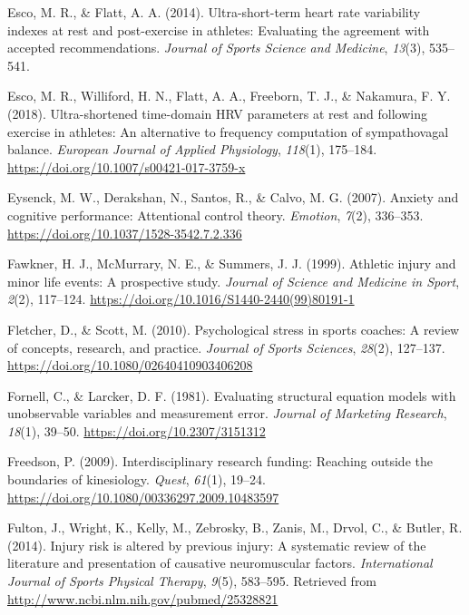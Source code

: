 \documentclass[man,floatsintext]{apa6}
\begin{document}
\leavevmode\hypertarget{ref-Esco2014}{}%
Esco, M. R., \& Flatt, A. A. (2014). Ultra-short-term heart rate variability indexes at rest and post-exercise in athletes: Evaluating the agreement with accepted recommendations. \emph{Journal of Sports Science and Medicine}, \emph{13}(3), 535--541.

\leavevmode\hypertarget{ref-Esco2018}{}%
Esco, M. R., Williford, H. N., Flatt, A. A., Freeborn, T. J., \& Nakamura, F. Y. (2018). Ultra-shortened time-domain HRV parameters at rest and following exercise in athletes: An alternative to frequency computation of sympathovagal balance. \emph{European Journal of Applied Physiology}, \emph{118}(1), 175--184. \url{https://doi.org/10.1007/s00421-017-3759-x}

\leavevmode\hypertarget{ref-Eysenck2007}{}%
Eysenck, M. W., Derakshan, N., Santos, R., \& Calvo, M. G. (2007). Anxiety and cognitive performance: Attentional control theory. \emph{Emotion}, \emph{7}(2), 336--353. \url{https://doi.org/10.1037/1528-3542.7.2.336}

\leavevmode\hypertarget{ref-Fawkner1999}{}%
Fawkner, H. J., McMurrary, N. E., \& Summers, J. J. (1999). Athletic injury and minor life events: A prospective study. \emph{Journal of Science and Medicine in Sport}, \emph{2}(2), 117--124. \url{https://doi.org/10.1016/S1440-2440(99)80191-1}

\leavevmode\hypertarget{ref-Fletcher2010}{}%
Fletcher, D., \& Scott, M. (2010). Psychological stress in sports coaches: A review of concepts, research, and practice. \emph{Journal of Sports Sciences}, \emph{28}(2), 127--137. \url{https://doi.org/10.1080/02640410903406208}

\leavevmode\hypertarget{ref-Fornell1981}{}%
Fornell, C., \& Larcker, D. F. (1981). Evaluating structural equation models with unobservable variables and measurement error. \emph{Journal of Marketing Research}, \emph{18}(1), 39--50. \url{https://doi.org/10.2307/3151312}

\leavevmode\hypertarget{ref-Freedson2009}{}%
Freedson, P. (2009). Interdisciplinary research funding: Reaching outside the boundaries of kinesiology. \emph{Quest}, \emph{61}(1), 19--24. \url{https://doi.org/10.1080/00336297.2009.10483597}

\leavevmode\hypertarget{ref-Fulton2014}{}%
Fulton, J., Wright, K., Kelly, M., Zebrosky, B., Zanis, M., Drvol, C., \& Butler, R. (2014). Injury risk is altered by previous injury: A systematic review of the literature and presentation of causative neuromuscular factors. \emph{International Journal of Sports Physical Therapy}, \emph{9}(5), 583--595. Retrieved from \url{http://www.ncbi.nlm.nih.gov/pubmed/25328821}
\end{document}
